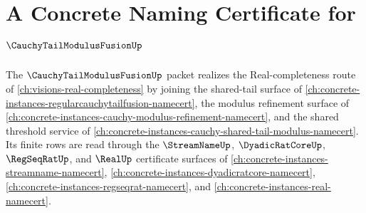 \chapter{A Concrete Naming Certificate for $\CauchyTailModulusFusionUp$}
\label{ch:concrete-instances-cauchy-tail-modulus-fusion-namecert}

The $\CauchyTailModulusFusionUp$ packet realizes the Real-completeness route of \autoref{ch:visions-real-completeness} by joining the shared-tail surface of \autoref{ch:concrete-instances-regularcauchytailfusion-namecert}, the modulus refinement surface of \autoref{ch:concrete-instances-cauchy-modulus-refinement-namecert}, and the shared threshold service of \autoref{ch:concrete-instances-cauchy-shared-tail-modulus-namecert}. Its finite rows are read through the $\StreamNameUp$, $\DyadicRatCoreUp$, $\RegSeqRatUp$, and $\RealUp$ certificate surfaces of \autoref{ch:concrete-instances-streamname-namecert}, \autoref{ch:concrete-instances-dyadicratcore-namecert}, \autoref{ch:concrete-instances-regseqrat-namecert}, and \autoref{ch:concrete-instances-real-namecert}.

